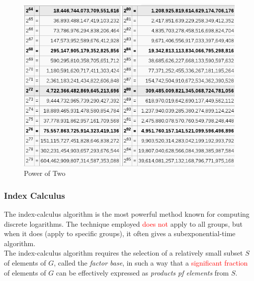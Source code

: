 \documentclass[hyperref=true]{beamer}
\begin{document}
\begin{frame}
  \begin{figure}
    \centering
    \includegraphics[scale=0.4]{PowOfTwo.png}
    \caption{Power of Two}
    \label{fig:attack-power-of-two}
  \end{figure}
\end{frame}

\begin{frame}
  \frametitle{Index Calculus}
The index-calculus algorithm is the most powerful method known for
computing discrete logarithms. The technique employed
\textcolor{red}{does not} apply to all groups, but when it does (apply
to specific groups), it often gives a subexponential-time algorithm.\\[8pt]
The index-calculus algorithm requires the selection of a relatively
small subset $S$ of elements of $G$, called the \emph{factor base}, in such
a way that a \textcolor{red}{significant fraction} of elements of $G$
can be effectively expressed as \emph{products pf elements} from $S$.
\end{frame}
\end{document}
